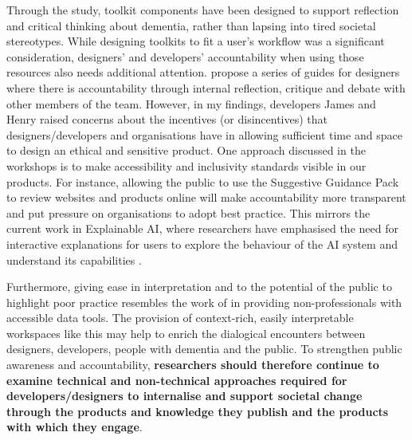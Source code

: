 Through the study, toolkit components have been designed to support reflection and critical thinking about dementia, rather than lapsing into tired societal stereotypes. While designing toolkits to fit a user’s workflow was a significant consideration, designers’ and developers’ accountability when using those resources also needs additional attention. \cite{frauenberger2015pursuit} propose a series of guides for designers where there is accountability through internal reflection, critique and debate with other members of the team. However, in my findings, developers James and Henry raised concerns about the incentives (or disincentives) that designers/developers and organisations have in allowing sufficient time and space to design an ethical and sensitive product. One approach discussed in the workshops is to make accessibility and inclusivity standards visible in our products. For instance, allowing the public to use the Suggestive Guidance Pack to review websites and products online will make accountability more transparent and put pressure on organisations to adopt best practice. This mirrors the current work in Explainable AI, where researchers have emphasised the need for interactive explanations for users to explore the behaviour of the AI system and understand its capabilities \citep{abdul2018trends}. 

Furthermore, giving ease in interpretation and to the potential of the public to highlight poor practice resembles the work of \cite{puussaar2018making} in providing non-professionals with accessible data tools. The provision of context-rich, easily interpretable workspaces like this may help to enrich the dialogical encounters between designers, developers, people with dementia and the public. To strengthen public awareness and accountability, \textbf{researchers should therefore continue to examine technical and non-technical approaches required for developers/designers to internalise and support societal change through the products and knowledge they publish and the products with which they engage}.

